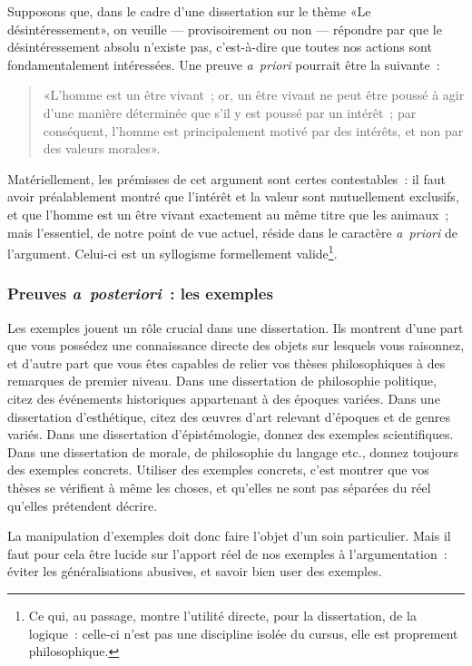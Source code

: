 \documentclass[a4paper,11pt]{article}
\newcommand{\cad}{c'est-à-dire}
\newcommand{\apr}{\emph{a~priori}}
\newcommand{\apost}{\emph{a~posteriori}}
\begin{document}
Supposons que, dans le cadre d'une dissertation sur le thème «Le
désintéressement», on veuille --- provisoirement ou non --- répondre par
que le désintéressement absolu n'existe pas, \cad{} que toutes nos
actions sont fondamentalement intéressées. Une preuve \apr{} pourrait
être la suivante~:
\begin{quote}
  «L'homme est un être vivant~; or, un être vivant ne peut être poussé à
  agir d'une manière déterminée que s'il y est poussé par un intérêt~;
  par conséquent, l'homme est principalement motivé par des intérêts, et
  non par des valeurs morales».
\end{quote}
Matériellement, les prémisses de cet argument sont certes contestables~:
il faut avoir préalablement montré que l'intérêt et la valeur sont
mutuellement exclusifs, et que l'homme est un être vivant exactement au
même titre que les animaux~; mais l'essentiel, de notre point de vue
actuel, réside dans le caractère \apr{} de l'argument. Celui-ci est un
syllogisme formellement valide\footnote{Ce qui, au passage, montre
  l'utilité directe, pour la dissertation, de la logique~: celle-ci
  n'est pas une discipline isolée du cursus, elle est proprement
  philosophique.}.

\par


\subsubsection{Preuves \apost{}~: les exemples}

Les exemples jouent un rôle crucial dans une dissertation. Ils montrent
d'une part que vous possédez une connaissance directe des objets sur
lesquels vous raisonnez, et d'autre part que vous êtes capables de
relier vos thèses philosophiques à des remarques de premier niveau. Dans
une dissertation de philosophie politique, citez des événements
historiques appartenant à des époques variées. Dans une dissertation
d'esthétique, citez des œuvres d'art relevant d'époques et de genres
variés. Dans une dissertation d'épistémologie, donnez des exemples
scientifiques. Dans une dissertation de morale, de philosophie du
langage etc., donnez toujours des exemples concrets. Utiliser des
exemples concrets, c'est montrer que vos thèses se vérifient à même les
choses, et qu'elles ne sont pas séparées du réel qu'elles prétendent
décrire.

\par

La manipulation d'exemples doit donc faire l'objet d'un soin
particulier. Mais il faut pour cela être lucide sur l'apport réel de nos
exemples à l'argumentation~: éviter les généralisations abusives, et
savoir bien user des exemples.
\end{document}
